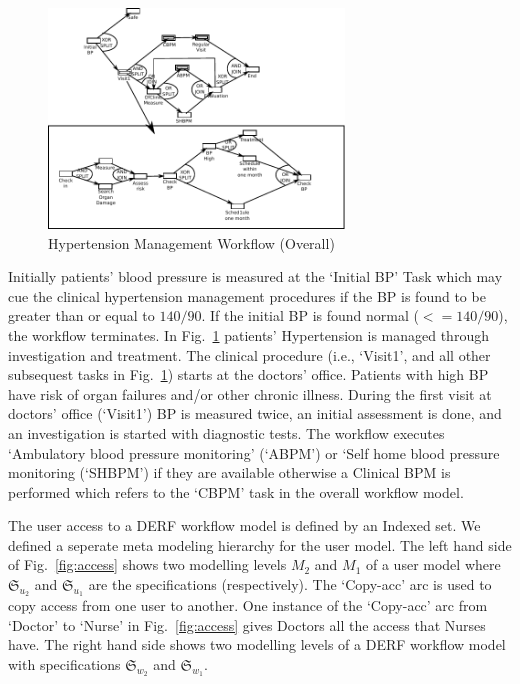 \documentclass[a4paper]{llncs}
\begin{document}
\begin{figure}
  \begin{center}
    \includegraphics[width=0.7\textwidth]{bp.pdf}
    \caption{Hypertension Management Workflow (Overall)}
    \label{fig:htnoverall}
  \end{center}
\end{figure}

Initially patients' blood pressure is measured at the `Initial BP' Task which may cue the clinical hypertension management procedures if the BP is found to be greater than or equal to $140/90$. 
If the initial BP is found normal ($<=140/90$), the workflow terminates. 
In Fig.~\ref{fig:htnoverall} patients' Hypertension is managed through investigation and treatment. 
The clinical procedure (i.e., `Visit1', and all other subsequest tasks in Fig.~\ref{fig:htnoverall}) starts at the doctors' office. 
Patients with high BP have risk of organ failures and/or other chronic illness. 
During the first visit at doctors' office (`Visit1') BP is measured twice, an initial assessment is done, and an investigation is started with diagnostic tests. 
The workflow executes `Ambulatory blood pressure monitoring' (`ABPM') or `Self home blood pressure monitoring (`SHBPM') if they are available otherwise a Clinical BPM is performed which refers to 
the `CBPM' task in the overall workflow model.





The user access to a DERF workflow model is defined by an Indexed set. We defined a seperate meta modeling hierarchy for the user model. The left hand side of Fig.~\ref{fig:access} shows two 
modelling levels $M_2$ and $M_1$ of a user model where $\mathfrak{S}_{u_{2}}$ and $\mathfrak{S}_{u_{1}}$ are the specifications (respectively). 
The `Copy-acc' arc is used to copy access from one user to another. One instance of the `Copy-acc' arc from `Doctor' to `Nurse' in Fig.~\ref{fig:access} gives Doctors all the access that Nurses have. 
The right hand side shows two modelling levels of a DERF workflow model with specifications $\mathfrak{S}_{w_{2}}$ and $\mathfrak{S}_{w_{1}}$. 
\end{document}
